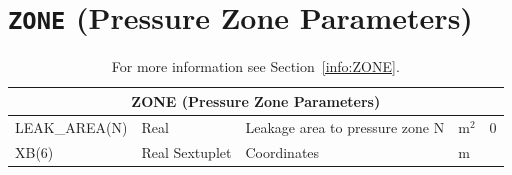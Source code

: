 \documentclass[11pt]{book}
\begin{document}

\vspace{\baselineskip}

\vfill

\section{\texorpdfstring{{\tt ZONE}}{ZONE} (Pressure Zone Parameters)}

\hspace{1in}

\begin{table}[H]
\caption{For more information see Section~\ref{info:ZONE}.}\label{tbl:ZONE}
\noindent
\begin{tabular*}{\textwidth}{@{\extracolsep{\fill}}|l|l|l|l|l|}
\hline
\multicolumn{5}{|c|}{{\ct ZONE} (Pressure Zone Parameters)} \\ \hline \hline
{\ct LEAK\_AREA(N)}         & Real              & Leakage area to pressure zone {\ct N}             & m$^2$                 & 0             \\ \hline
{\ct XB(6)}                 & Real Sextuplet    & Coordinates                                       & m                     &               \\ \hline
\end{tabular*}
\end{table}

\vfill






\clearpage
\end{document}
